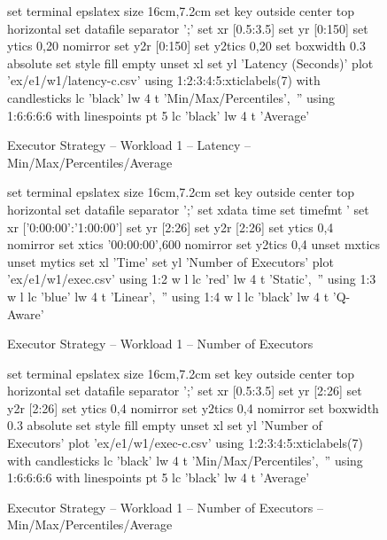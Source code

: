 \begin{figure}[!htbp]
	\centering
	\begin{minipage}[h]{\linewidth}
		\centering
		\begin{gnuplot}[terminal=epslatex, terminaloptions=color colortext]
			set terminal epslatex size 16cm,7.2cm
			set key outside center top horizontal
			set datafile separator ';'
			set xr [0.5:3.5]
			set yr [0:150]
			set ytics 0,20 nomirror
			set y2r [0:150]
			set y2tics 0,20
			set boxwidth 0.3 absolute
			set style fill empty
			unset xl
			set yl 'Latency (Seconds)'
			plot 'ex/e1/w1/latency-c.csv' using 1:2:3:4:5:xticlabels(7) with candlesticks lc 'black' lw 4 t 'Min/Max/Percentiles',\
			'' using 1:6:6:6:6 with linespoints pt 5 lc 'black' lw 4 t 'Average' 
		\end{gnuplot}
		\caption{Executor Strategy -- Workload 1 -- Latency -- Min/Max/Percentiles/Average}
		\label{eval:f:e1:w1:lat-c}
	\end{minipage}\hfil
	\begin{minipage}[h]{\linewidth}
		\centering
		\begin{gnuplot}[terminal=epslatex, terminaloptions=color colortext]
			set terminal epslatex size 16cm,7.2cm
			set key outside center top horizontal
			set datafile separator ';'
			set xdata time
			set timefmt '%
			set xr ['0:00:00':'1:00:00']
			set yr [2:26]
			set y2r [2:26]
			set ytics 0,4 nomirror
			set xtics '00:00:00',600 nomirror
			set y2tics 0,4
			unset mxtics
			unset mytics
			set xl 'Time'
			set yl 'Number of Executors'
			plot 'ex/e1/w1/exec.csv' using 1:2 w l lc 'red' lw 4 t 'Static',\
			'' using 1:3 w l lc 'blue' lw 4 t 'Linear',\
			'' using 1:4 w l lc 'black' lw 4 t 'Q-Aware'
		\end{gnuplot}
		\caption{Executor Strategy -- Workload 1 -- Number of Executors}
		\label{eval:f:e1:w1:exec}
	\end{minipage}\hfil
	\begin{minipage}[h]{\linewidth}
		\centering
		\begin{gnuplot}[terminal=epslatex, terminaloptions=color colortext]
			set terminal epslatex size 16cm,7.2cm
			set key outside center top horizontal
			set datafile separator ';'
			set xr [0.5:3.5]
			set yr [2:26]
			set y2r [2:26]
			set ytics 0,4 nomirror
			set y2tics 0,4 nomirror
			set boxwidth 0.3 absolute
			set style fill empty
			unset xl
			set yl 'Number of Executors'
			plot 'ex/e1/w1/exec-c.csv' using 1:2:3:4:5:xticlabels(7) with candlesticks lc 'black' lw 4 t 'Min/Max/Percentiles',\
			'' using 1:6:6:6:6 with linespoints pt 5 lc 'black' lw 4 t 'Average' 
		\end{gnuplot}
		\caption{Executor Strategy -- Workload 1 -- Number of Executors -- Min/Max/Percentiles/Average}
		\label{eval:f:e1:w1:exec-c}
	\end{minipage}
\end{figure}
